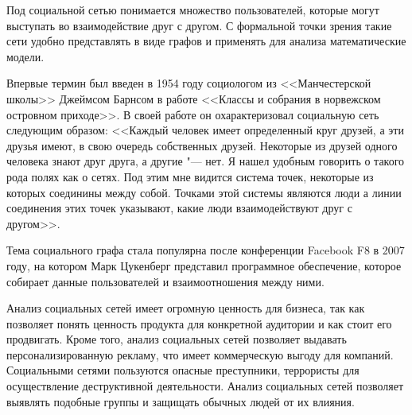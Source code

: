 Под социальной сетью понимается множество пользователей, которые могут выступать во взаимодействие друг с другом. С формальной точки зрения такие сети удобно представлять в виде графов и применять для анализа математические модели.

Впервые термин был введен в 1954 году социологом из <<Манчестерской школы>> Джеймсом Барнсом в работе <<Классы и собрания в норвежском островном приходе>>. В своей работе он охарактеризовал социальную сеть следующим образом: <<Каждый человек имеет определенный круг друзей, а эти друзья имеют, в свою очередь собственных друзей. Некоторые из друзей одного человека знают друг друга, а другие "--- нет. Я нашел удобным говорить о такого рода полях как о сетях. Под этим мне видится система точек, некоторые из которых соединины между собой. Точками этой системы являются люди а линии соединения этих точек указывают, какие люди взаимодействуют друг с другом>>\cite{Sazanov}.

Тема социального графа стала популярна после конференции Facebook F8 в 2007 году, на котором Марк Цукенберг представил программное обеспечение, которое собирает данные пользователей и взаимоотношения между ними\cite{CBSNews}.

Анализ социальных сетей имеет огромную ценность для бизнеса, так как позволяет понять ценность продукта для конкретной аудитории и как стоит его продвигать. Кроме того, анализ социальных сетей позволяет выдавать персонализированную рекламу, что имеет коммерческую выгоду для компаний. Социальными сетями пользуются опасные преступники, террористы для осуществление деструктивной деятельности. Анализ социальных сетей позволяет выявлять подобные группы и защищать обычных людей от их влияния\cite{hansen2010analyzing}.